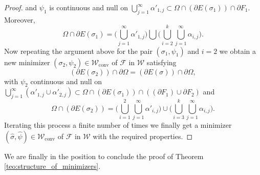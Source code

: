 \documentclass[11pt]{article}
\numberwithin{equation}{section}
\let\Om\Omega
\newcommand\admclassconv{{\mathcal W_\mathrm{conv}}}
\theoremstyle{definition}
\begin{document}
\begin{proof}
and $\psi_1$ is continuous and null on $\bigcup_{j=1}^\infty\alpha'_{1,j}\subset \Om\cap(\partial E(\sigma_{1}))\cap\partial F_1$.
Moreover,\vspace*{-3pt}
\begin{equation*}
\Om\cap \partial E(\sigma_1)=\biggl(\bigcup_{j=1}^\infty\alpha'_{1,j})\bigcup
(\bigcup_{i=2}^k\bigcup_{j=1}^\infty \alpha_{i,j}\biggr).
\end{equation*}
Now repeating the argument above for the pair $(\sigma_1,\psi_1)$ and $i=2$ we obtain a new minimizer $(\sigma_2,\psi_2)\in\admclassconv$ of $\mathcal F$ in $\mathcal W$ satisfying\vspace*{-3pt}
\begin{equation*}
(\partial E(\sigma_{2}))\cap\partial\Om= (\partial E(\sigma))\cap\partial\Om,
\end{equation*}
with $\psi_2$ continuous and null on $\bigcup_{j=1}^\infty(\alpha'_{1,j}\cup\alpha'_{2,j})\subset \Om \cap (\partial E(\sigma_{1}))\cap((\partial F_1)\cup\partial F_2)$
and\vspace*{-3pt}
\begin{equation*}
\Om \cap (\partial E(\sigma_2))=\biggl(\bigcup_{i=1}^2\bigcup_{j=1}^\infty\alpha'_{i,j})\cup
(\bigcup_{i=3}^k\bigcup_{j=1}^\infty \alpha_{i,j}\biggr).
\end{equation*}
Iterating this process a finite number of times we finally get a minimizer $(\widehat\sigma,\widehat\psi)\in\admclassconv$ of $\mathcal F$ in $\mathcal W$ with the required properties.
\end{proof}

We are finally in the position to conclude the proof of Theorem \ref{teo:structure_of_minimizers}.
\end{document}
